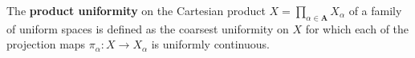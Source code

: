 The \textbf{product uniformity} on the Cartesian product $X = \prod_{\alpha \in \mathbf{A}} X_\alpha$ of a family of uniform spaces is defined as the coarsest uniformity on $X$ for which each of the projection maps $\pi_\alpha : X \to X_\alpha$ is uniformly continuous.

